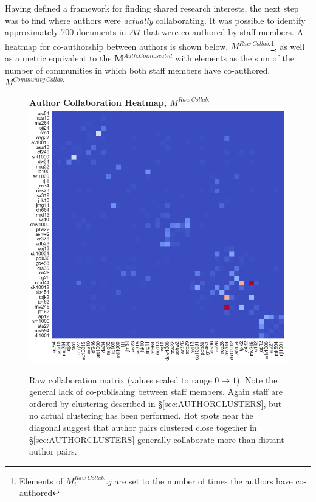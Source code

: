 Having defined a framework for finding shared research interests, the next step was to find where authors were \emph{actually} collaborating. It was possible to identify approximately 700 documents in $\Delta7$ that were co-authored by staff members. A heatmap for co-authorship between authors is shown below, $M^{Raw\ Collab.}$\footnote{Elements of $M^{Raw\ Collab.}_i.j$ are set to the number of times the authors have co-authored}, as well as a metric equivalent to the $\mathbf{M}^{Auth. Coinc.scaled}$ with elements as the sum of the number of communities in which both staff members have co-authored, $M^{Community\ Collab.}$.
\begin{figure}[H]
  \centering
  \textbf{Author Collaboration Heatmap, $M^{Raw\ Collab.}$}
    \includegraphics[width=\textwidth]{Analysis/raw_collabs.png}
    \caption[Author Collaboration Heatmap]{Raw collaboration matrix (values scaled to range $0 \rightarrow 1$). Note the general lack of co-publishing between staff members. Again staff are ordered by clustering described in \S\ref{sec:AUTHORCLUSTERS}, but no actual clustering has been performed. Hot spots near the diagonal suggest that author pairs clustered close together in \S\ref{sec:AUTHORCLUSTERS} generally collaborate more than distant author pairs.}
      \label{fig:rawcollabs}
  \end{figure}
